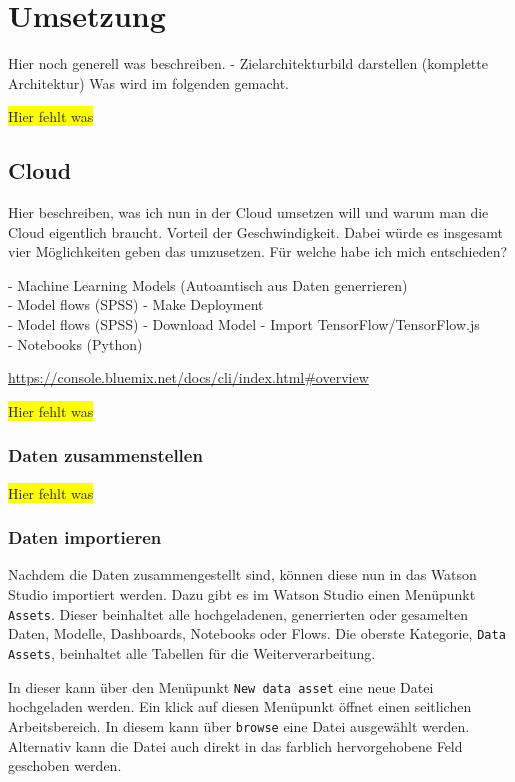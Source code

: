 \section{Umsetzung}
Hier noch generell was beschreiben. - Zielarchitekturbild darstellen (komplette Architektur)
Was wird im folgenden gemacht.

\colorbox{yellow}{Hier fehlt was}

\subsection{Cloud}
Hier beschreiben, was ich nun in der Cloud umsetzen will und warum man die Cloud eigentlich braucht. Vorteil der
Geschwindigkeit. Dabei würde es insgesamt vier Möglichkeiten geben das umzusetzen. Für welche habe ich mich
entschieden?

- Machine Learning Models (Autoamtisch aus Daten generrieren)\\
- Model flows (SPSS) - Make Deployment\\
- Model flows (SPSS) - Download Model - Import TensorFlow/TensorFlow.js\\
- Notebooks (Python)

\url{https://console.bluemix.net/docs/cli/index.html#overview}

\colorbox{yellow}{Hier fehlt was}

\subsubsection{Daten zusammenstellen}
\colorbox{yellow}{Hier fehlt was}

\subsubsection{Daten importieren}
Nachdem die Daten zusammengestellt sind, können diese nun in das Watson Studio importiert werden. Dazu gibt es im Watson
Studio einen Menüpunkt \texttt{Assets}. Dieser beinhaltet alle hochgeladenen, generrierten oder gesamelten Daten, Modelle,
Dashboards, Notebooks oder Flows. Die oberste Kategorie, \texttt{Data Assets}, beinhaltet alle Tabellen für die
Weiterverarbeitung.

In dieser kann über den Menüpunkt \texttt{New data asset} eine neue Datei hochgeladen werden. Ein klick auf diesen
Menüpunkt öffnet einen seitlichen Arbeitsbereich. In diesem kann über \texttt{browse} eine Datei ausgewählt werden.
Alternativ kann die Datei auch direkt in das farblich hervorgehobene Feld geschoben werden.

